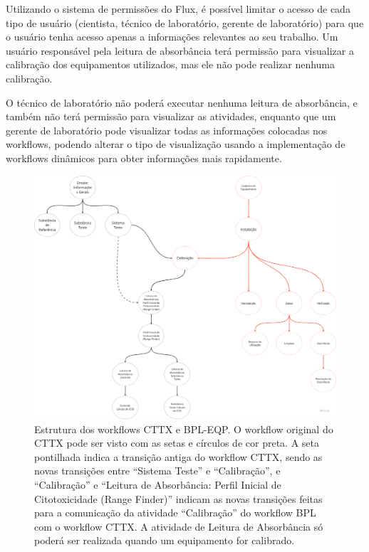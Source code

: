 Utilizando o sistema de permissões do Flux, é possível limitar o acesso de cada tipo de usuário (cientista, técnico de laboratório, gerente de laboratório) para que o usuário tenha acesso apenas a informações relevantes ao seu trabalho. Um usuário responsável pela leitura de absorbância terá permissão para visualizar a calibração dos equipamentos utilizados, mas ele não pode realizar nenhuma calibração.

O técnico de laboratório não poderá executar nenhuma leitura de absorbância, e também não terá permissão para visualizar as atividades, enquanto que um gerente de laboratório pode visualizar todas as informações colocadas nos workflows, podendo alterar o tipo de visualização usando a implementação de workflows dinâmicos para obter informações mais rapidamente.

\begin{figure}
    \centering
    \includegraphics[width=1\textwidth]{imgs/CTTX-EQP/estrutura_cttx_eqp.png}
    \caption{Estrutura dos workflows CTTX e BPL-EQP. O workflow original do CTTX pode ser visto com as setas e círculos de cor preta. A seta pontilhada indica a transição antiga do workflow CTTX, sendo as novas transições entre ``Sistema Teste'' e ``Calibração'', e ``Calibração'' e ``Leitura de Absorbância: Perfil Inicial de Citotoxicidade (Range Finder)'' indicam as novas transições feitas para a comunicação da atividade ``Calibração'' do workflow BPL com o workflow CTTX. A atividade de Leitura de Absorbância só poderá ser realizada quando um equipamento for calibrado.}
    \label{fig:cttx_eqp_structure}
\end{figure}

